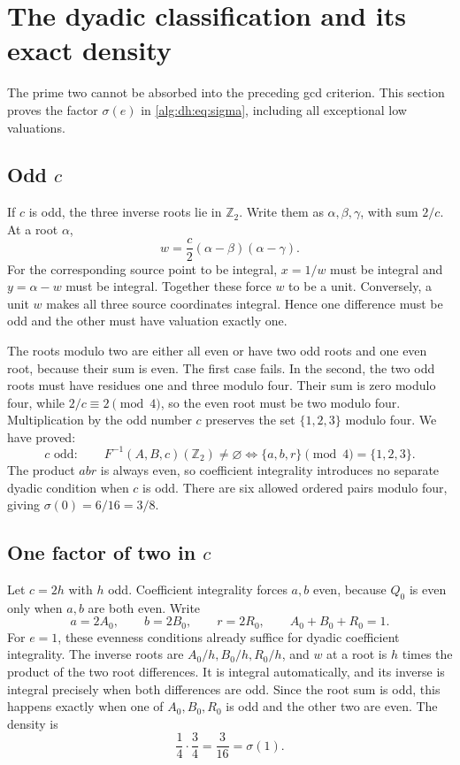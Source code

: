 \documentclass[11pt]{article}
\numberwithin{equation}{section}
\theoremstyle{plain}
\theoremstyle{plain}
\theoremstyle{plain}
\theoremstyle{definition}
\theoremstyle{definition}
\theoremstyle{definition}
\theoremstyle{remark}
\newcommand{\Z}{\mathbb Z}\newcommand{\Q}{\mathbb Q}
\begin{document}
\section{The dyadic classification and its exact density}\label{alg:dh:sec:dyadic}
The prime two cannot be absorbed into the preceding gcd criterion.
This section proves the factor $\sigma(e)$ in \eqref{alg:dh:eq:sigma}, including
all exceptional low valuations.

\subsection{Odd \texorpdfstring{$c$}{c}}
If $c$ is odd, the three inverse roots lie in $\Z_2$. Write them as
$\alpha,\beta,\gamma$, with sum $2/c$. At a root $\alpha$,
\[
 w=\frac c2(\alpha-\beta)(\alpha-\gamma).
\]
For the corresponding source point to be integral, $x=1/w$ must be
integral and $y=\alpha-w$ must be integral. Together these force $w$ to
be a unit. Conversely, a unit $w$ makes all three source coordinates
integral. Hence one difference must be odd and the other must have
valuation exactly one.

The roots modulo two are either all even or have two odd roots and one
even root, because their sum is even. The first case fails. In the
second, the two odd roots must have residues one and three modulo four.
Their sum is zero modulo four, while $2/c\equiv2\pmod4$, so the even
root must be two modulo four. Multiplication by the odd number $c$
preserves the set $\{1,2,3\}$ modulo four. We have proved:
\begin{equation}\label{alg:dh:eq:odd-c-dyadic}
 c\text{ odd}:\qquad
 F^{-1}(A,B,c)(\Z_2)\ne\varnothing
 \iff \{a,b,r\}\pmod4=\{1,2,3\}.
\end{equation}
The product $abr$ is always even, so coefficient integrality introduces
no separate dyadic condition when $c$ is odd. There are six allowed
ordered pairs modulo four, giving $\sigma(0)=6/16=3/8$.

\subsection{One factor of two in \texorpdfstring{$c$}{c}}
Let $c=2h$ with $h$ odd. Coefficient integrality forces $a,b$ even,
because $Q_0$ is even only when $a,b$ are both even. Write
\begin{equation}\label{alg:dh:eq:half-numerators}
 a=2A_0,\qquad b=2B_0,\qquad r=2R_0,\qquad
 A_0+B_0+R_0=1.
\end{equation}
For $e=1$, these evenness conditions already suffice for dyadic
coefficient integrality. The inverse roots are $A_0/h,B_0/h,R_0/h$,
and $w$ at a root is $h$ times the product of the two root differences.
It is integral automatically, and its inverse is integral precisely
when both differences are odd. Since the root sum is odd, this happens
exactly when one of $A_0,B_0,R_0$ is odd and the other two are even.
The density is
\[
 \frac14\cdot\frac34=\frac3{16}=\sigma(1).
\]
\end{document}
